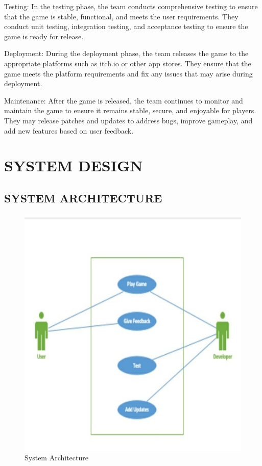 \documentclass[12pt]{report}
\begin{document}
Testing: In the testing phase, the team conducts comprehensive testing to ensure that the game is stable, functional, and meets the user requirements. They conduct unit testing, integration testing, and acceptance testing to ensure the game is ready for release.

Deployment: During the deployment phase, the team releases the game to the appropriate platforms such as itch.io or other app stores. They ensure that the game meets the platform requirements and fix any issues that may arise during deployment.

Maintenance: After the game is released, the team continues to monitor and maintain the game to ensure it remains stable, secure, and enjoyable for players. They may release patches and updates to address bugs, improve gameplay, and add new features based on user feedback.


\clearpage


\centering
\section{ SYSTEM DESIGN}
\raggedright
\subsection{SYSTEM ARCHITECTURE}

\justifying
\setlength{\parindent}{4em}
\setlength{\parskip}{0.5em}
\renewcommand{\baselinestretch}{1.5}

\vspace{0.5cm}
\begin{figure}[h]
\centering
\includegraphics[scale=0.7]{Architecture.png}
\caption{ System Architecture}
\label{ System Architecture}
\end{figure}
\vspace{0.1cm}
\end{document}
